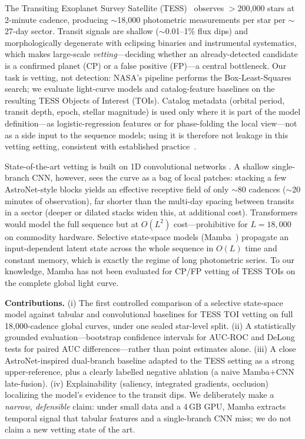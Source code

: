 \documentclass[conference]{IEEEtran}
\begin{document}
The Transiting Exoplanet Survey Satellite (TESS)~\cite{ricker2015} observes
$>$200{,}000 stars at
2-minute cadence, producing $\sim$18{,}000 photometric measurements per star per
$\sim$27-day sector. Transit signals are shallow ($\sim$0.01--1\% flux dips) and
morphologically degenerate with eclipsing binaries and instrumental systematics,
which makes large-scale \emph{vetting}---deciding whether an already-detected
candidate is a confirmed planet (CP) or a false positive (FP)---a central
bottleneck. Our task is vetting, not detection: NASA's pipeline performs the
Box-Least-Squares search; we evaluate light-curve models and catalog-feature
baselines on the resulting TESS Objects of Interest (TOIs). Catalog metadata
(orbital period, transit depth, epoch, stellar magnitude) is used only where it is
part of the model definition---as logistic-regression features or for phase-folding
the local view---not as a side input to the sequence models; using it is therefore
not leakage in this vetting setting, consistent with established
practice~\cite{shallue2018,valizadegan2022}.

State-of-the-art vetting is built on 1D convolutional networks
\cite{shallue2018,valizadegan2022,exominerpp,dartvetter}. A shallow single-branch
CNN, however, sees the curve as a bag of local patches: stacking a few
AstroNet-style blocks yields an effective receptive field of only $\sim$80 cadences
($\sim$20 minutes of observation), far shorter than the multi-day spacing between
transits in a sector (deeper or dilated stacks widen this, at additional cost).
Transformers would model the full sequence but at $O(L^2)$ cost---prohibitive for
$L=18{,}000$ on commodity hardware. Selective state-space models
(Mamba~\cite{gu2023mamba}) propagate an input-dependent latent state across the
whole sequence in $O(L)$ time and constant memory, which is exactly the regime of
long photometric series. To our knowledge, Mamba has not been evaluated for
CP/FP vetting of TESS TOIs on the complete global light curve.

\textbf{Contributions.} (i) The first controlled comparison of a selective
state-space model against tabular and convolutional baselines for TESS TOI
vetting on full 18{,}000-cadence global curves, under one sealed star-level split.
(ii) A statistically grounded evaluation---bootstrap confidence intervals for
AUC-ROC and DeLong tests for paired AUC differences---rather than point
estimates alone. (iii) A close AstroNet-inspired dual-branch baseline adapted to
the TESS setting as a strong upper-reference, plus a clearly labelled
negative ablation (a naive Mamba$+$CNN late-fusion). (iv) Explainability
(saliency, integrated gradients, occlusion) localizing the model's evidence to the
transit dips. We deliberately make a \emph{narrow, defensible} claim: under small
data and a 4\,GB GPU, Mamba extracts temporal signal that tabular features and a
single-branch CNN miss; we do not claim a new vetting state of the art.
\end{document}
